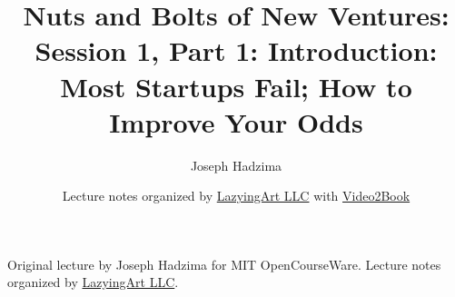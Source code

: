\documentclass[11pt,oneside]{book}
\begin{document}
\frontmatter
\title{Nuts and Bolts of New Ventures: Session 1, Part 1: Introduction: Most Startups Fail; How to Improve Your Odds}
\author{Joseph Hadzima}
\date{Lecture notes organized by \href{https://lazying.art}{LazyingArt LLC} with \href{https://github.com/lachlanchen/Video2Book}{Video2Book}}
\maketitle
\begin{center}
\small Original lecture by Joseph Hadzima for MIT OpenCourseWare. Lecture notes organized by \href{https://lazying.art}{LazyingArt LLC}.
\end{center}
\clearpage
\mainmatter

\end{document}
